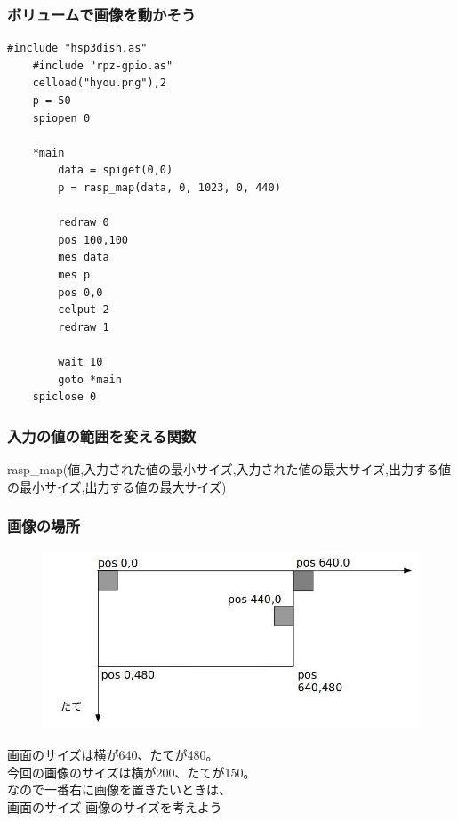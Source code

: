 \begin{frame}[fragile]
    \frametitle{ボリュームで画像を動かそう}
    \begin{lstlisting}[title=\textasciitilde/05/angle.hsp]
    #include "hsp3dish.as"
    #include "rpz-gpio.as"
    celload("hyou.png"),2
    p = 50
    spiopen 0

    *main
	    data = spiget(0,0)
	    p = rasp_map(data, 0, 1023, 0, 440)

	    redraw 0
	    pos 100,100
	    mes data
	    mes p
	    pos 0,0
	    celput 2
	    redraw 1

    	wait 10	
	    goto *main
    spiclose 0
    \end{lstlisting}
\end{frame}

\begin{frame}[fragile]
    \frametitle{入力の値の範囲を変える関数}
    \begin{center}
        \begin{figure}
            
        \end{figure}
        {rasp\_map(値,入力された値の最小サイズ,入力された値の最大サイズ,出力する値の最小サイズ,出力する値の最大サイズ)}
    \end{center}
\end{frame}

\begin{frame}[fragile]
    \frametitle{画像の場所}
    \begin{center}
        \begin{figure}
            \includegraphics[width=\textwidth]{images/slide/volume_position.jpg}
        \end{figure}
        {画面のサイズは横が640、たてが480。\\
        今回の画像のサイズは横が200、たてが150。\\
        なので一番右に画像を置きたいときは、\\
        画面のサイズ-画像のサイズを考えよう}
    \end{center}
\end{frame}

